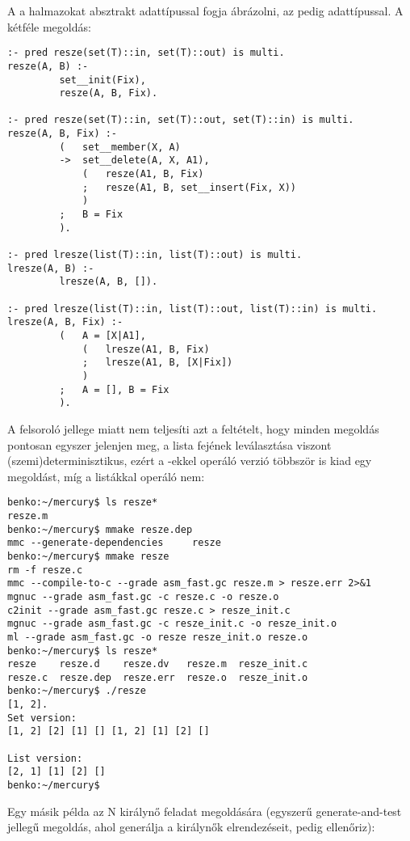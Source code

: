 A  a halmazokat  absztrakt adattípussal fogja ábrázolni,
az  pedig  adattípussal. A kétféle megoldás:

\begin{verbatim}
:- pred resze(set(T)::in, set(T)::out) is multi.
resze(A, B) :-
         set__init(Fix),
         resze(A, B, Fix).

:- pred resze(set(T)::in, set(T)::out, set(T)::in) is multi.
resze(A, B, Fix) :-
         (   set__member(X, A)
         ->  set__delete(A, X, A1),
             (   resze(A1, B, Fix)
             ;   resze(A1, B, set__insert(Fix, X))
             )
         ;   B = Fix
         ).

:- pred lresze(list(T)::in, list(T)::out) is multi.
lresze(A, B) :-
         lresze(A, B, []).

:- pred lresze(list(T)::in, list(T)::out, list(T)::in) is multi.
lresze(A, B, Fix) :-
         (   A = [X|A1],
             (   lresze(A1, B, Fix)
             ;   lresze(A1, B, [X|Fix])
             )
         ;   A = [], B = Fix
         ).
\end{verbatim}

A  felsoroló jellege miatt nem teljesíti azt a feltételt, hogy
minden megoldás pontosan egyszer jelenjen meg, a lista fejének leválasztása viszont
(szemi)determinisztikus, ezért a -ekkel operáló verzió többször is kiad
egy megoldást, míg a listákkal operáló nem:

\begin{verbatim}
benko:~/mercury$ ls resze*
resze.m
benko:~/mercury$ mmake resze.dep
mmc --generate-dependencies     resze
benko:~/mercury$ mmake resze
rm -f resze.c
mmc --compile-to-c --grade asm_fast.gc resze.m > resze.err 2>&1
mgnuc --grade asm_fast.gc -c resze.c -o resze.o
c2init --grade asm_fast.gc resze.c > resze_init.c
mgnuc --grade asm_fast.gc -c resze_init.c -o resze_init.o
ml --grade asm_fast.gc -o resze resze_init.o resze.o     
benko:~/mercury$ ls resze*
resze    resze.d    resze.dv   resze.m  resze_init.c
resze.c  resze.dep  resze.err  resze.o  resze_init.o
benko:~/mercury$ ./resze
[1, 2].
Set version:
[1, 2] [2] [1] [] [1, 2] [1] [2] []

List version:
[2, 1] [1] [2] []
benko:~/mercury$
\end{verbatim}

Egy másik  példa az N királynő feladat megoldására (egyszerű
generate-and-test jellegű megoldás, ahol  generálja a királynők
elrendezéseit,  pedig ellenőriz):

